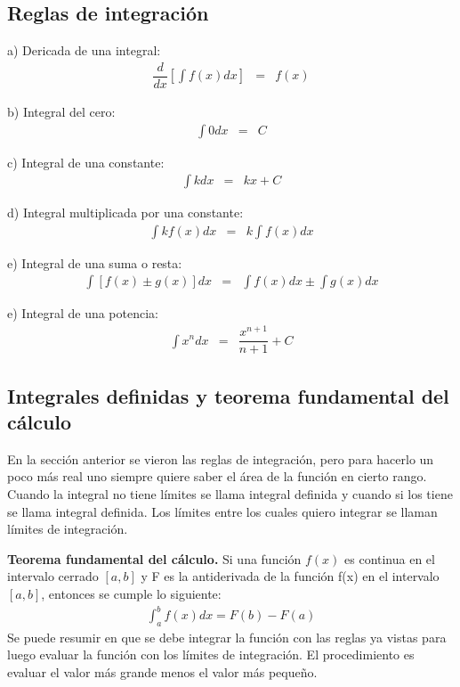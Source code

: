 \subsection{Reglas de integración}

\noindent a) Dericada de una integral: \\
\begin{eqnarray}
\dfrac{d}{dx}\left[ \int  f(x)dx \right]&=& f(x)
\end{eqnarray}

\noindent b) Integral del cero: \\
\begin{eqnarray}
\int 0dx &=& C
\end{eqnarray}

\noindent c) Integral de una constante:\\
\begin{eqnarray}
 \int kdx &=& kx + C
\end{eqnarray}

\noindent d) Integral multiplicada por una constante:\\
\begin{eqnarray}
 \int kf(x)dx &=&  k\int f(x)dx 
\end{eqnarray}

\noindent e) Integral de una suma o resta:\\
\begin{eqnarray}
 \int \left[f(x)\pm g(x) \right]dx &=&\int f(x)dx \pm \int g(x)dx 
\end{eqnarray}

\noindent e) Integral de una potencia:\\
\begin{eqnarray}
 \int x^{n}dx &=&\dfrac{x^{n+1}}{n+1} +C
\end{eqnarray}
 
\subsection{Integrales definidas y teorema fundamental del cálculo}

En la sección anterior se vieron las reglas de integración, pero para hacerlo un poco más real uno siempre quiere saber el área de la función en cierto rango. Cuando la integral no tiene límites se llama integral definida y cuando si los tiene se llama integral definida. Los límites entre los cuales quiero integrar se llaman límites de integración.

\begin{mydef}
\textbf{Teorema fundamental del cálculo. } Si una función $f(x)$ es continua en el intervalo cerrado $[a,b]$ y F es la antiderivada de la función f(x) en el intervalo $[a,b]$, entonces se cumple lo siguiente:
\begin{eqnarray}
\int_{a}^{b}f(x)dx=F(b)-F(a)
\end{eqnarray}
Se puede resumir en que se debe integrar la función con las reglas ya vistas para luego evaluar la función con los límites de integración. El procedimiento es evaluar el valor más grande menos el valor más pequeño.
\end{mydef}

